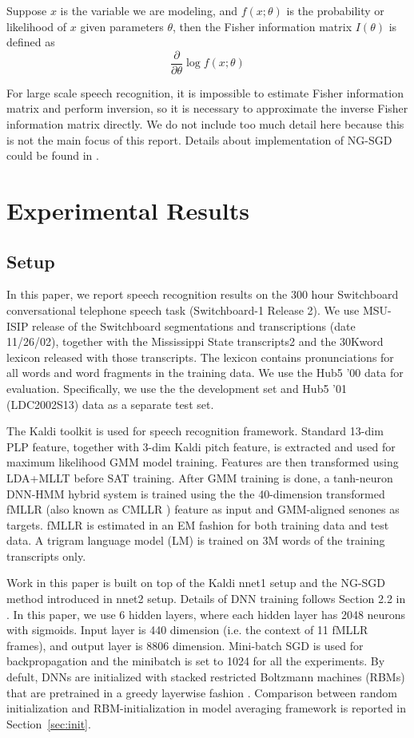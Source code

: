 \documentclass{article}
\begin{document}
Suppose $x$ is the variable we are modeling, and $f(x;\theta)$ is the probability or likelihood of $x$ given parameters $\theta$, then the
Fisher information matrix $I(\theta)$ is defined as
\begin{equation}
\frac{\partial}{\partial\theta}\log f(x;\theta)
\end{equation}

For large scale speech recognition, it is impossible to estimate Fisher information matrix and perform inversion, 
so it is necessary to approximate the inverse Fisher information matrix directly. We do not include too much 
detail here because this is not the main focus of this report. Details about implementation of NG-SGD could 
be found in \cite{povey2014parallel}.

\section{Experimental Results}
\subsection{Setup}
In this paper, we report speech recognition results on the 300 hour Switchboard conversational telephone speech task 
(Switchboard-1 Release 2). We use MSU-ISIP release of the Switchboard segmentations and transcriptions (date 11/26/02),
together with the Mississippi State transcripts2 and the 30Kword lexicon released with those transcripts. 
The lexicon contains pronunciations for all words and word fragments in the training data. We use the Hub5 ’00 data for
evaluation. Specifically, we use the  the development set and Hub5 ’01 (LDC2002S13) data as a separate test set.

The Kaldi toolkit\cite{kaldi11} is used for speech recognition framework. Standard 13-dim PLP feature,
together with 3-dim Kaldi pitch feature, is extracted and used for maximum
likelihood GMM model training. Features are then transformed using LDA+MLLT before SAT training.
After GMM training is done, a tanh-neuron DNN-HMM hybrid system is trained using the the 40-dimension 
transformed fMLLR (also known as CMLLR \cite{gales1996generation}) feature as input and GMM-aligned senones 
as targets. fMLLR is estimated in an EM fashion for both training data and test data. A trigram language model (LM) is trained 
on 3M words of the training transcripts only.

Work in this paper is built on top of the Kaldi nnet1 setup and the NG-SGD method introduced in nnet2 setup. 
Details of DNN training follows Section 2.2 in \cite{vesely2013sequence}. In this paper, we use 6 hidden layers, where each 
hidden layer has 2048 neurons with sigmoids. Input layer is 440 dimension (i.e. the context of 11 fMLLR frames), 
and output layer is 8806 dimension. Mini-batch SGD is used for backpropagation and the minibatch is set to 1024 for all
the experiments. By defult, DNNs are initialized with stacked restricted Boltzmann machines (RBMs) that are pretrained 
in a greedy layerwise fashion \cite{hinton2006fast}. Comparison between random initialization and RBM-initialization 
in model averaging framework is reported in Section~\ref{sec:init}.
\end{document}
